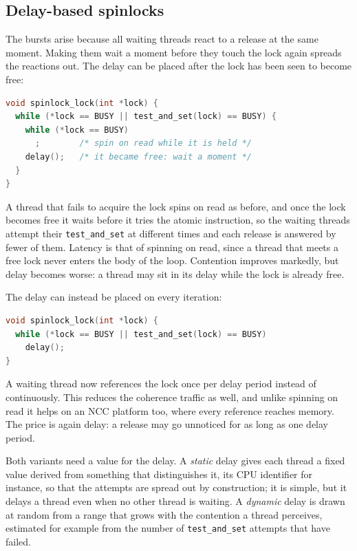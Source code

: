 \documentclass[../main.tex]{subfiles}
\begin{document}
\subsection{Delay-based spinlocks}

The bursts arise because all waiting threads react to a release at the same
moment.  Making them wait a moment before they touch the lock again spreads
the reactions out.  The delay can be placed after the lock has been seen to
become free:
\begin{lstlisting}[language=C, numbers=none]
void spinlock_lock(int *lock) {
  while (*lock == BUSY || test_and_set(lock) == BUSY) {
    while (*lock == BUSY)
      ;        /* spin on read while it is held */
    delay();   /* it became free: wait a moment */
  }
}
\end{lstlisting}
A thread that fails to acquire the lock spins on read as before, and once
the lock becomes free it waits before it tries the atomic instruction, so
the waiting threads attempt their \texttt{test\_and\_set} at different
times and each release is answered by fewer of them.  Latency is that of
spinning on read, since a thread that meets a free lock never enters the
body of the loop.  Contention improves markedly, but delay becomes worse: a
thread may sit in its delay while the lock is already free.

The delay can instead be placed on every iteration:
\begin{lstlisting}[language=C, numbers=none]
void spinlock_lock(int *lock) {
  while (*lock == BUSY || test_and_set(lock) == BUSY)
    delay();
}
\end{lstlisting}
A waiting thread now references the lock once per delay period instead of
continuously.  This reduces the coherence traffic as well, and unlike
spinning on read it helps on an NCC platform too, where every reference
reaches memory.  The price is again delay: a release may go unnoticed for
as long as one delay period.

Both variants need a value for the delay.  A \emph{static} delay gives each
thread a fixed value derived from something that distinguishes it, its CPU
identifier for instance, so that the attempts are spread out by
construction; it is simple, but it delays a thread even when no other
thread is waiting.  A \emph{dynamic} delay is drawn at random from a range
that grows with the contention a thread perceives, estimated for example
from the number of \texttt{test\_and\_set} attempts that have
failed.
\end{document}
